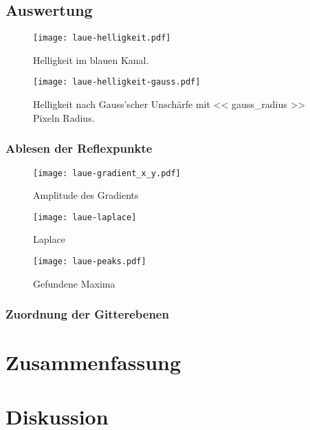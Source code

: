 \section{Auswertung}

\begin{figure}[htbp]
    \centering
    \texttt{[image: laue-helligkeit.pdf]}
    \caption{%
        Helligkeit im blauen Kanal.
    }
    \label{fig:}
\end{figure}

\begin{figure}[htbp]
    \centering
    \texttt{[image: laue-helligkeit-gauss.pdf]}
    \caption{%
        Helligkeit nach Gauss'scher Unschärfe mit << gauss_radius >> Pixeln
        Radius.
    }
    \label{fig:}
\end{figure}

\subsection{Ablesen der Reflexpunkte}

\begin{figure}[htbp]
    \centering
    \texttt{[image: laue-gradient\_x\_y.pdf]}
    \caption{%
        Amplitude des Gradients
    }
    \label{fig:}
\end{figure}

\begin{figure}[htbp]
    \centering
    \texttt{[image: laue-laplace]}
    \caption{%
        Laplace
    }
    \label{fig:}
\end{figure}

\begin{figure}[htbp]
    \centering
    \texttt{[image: laue-peaks.pdf]}
    \caption{%
        Gefundene Maxima
    }
    \label{fig:}
\end{figure}

\subsection{Zuordnung der Gitterebenen}

\chapter{Zusammenfassung}

\chapter{Diskussion}

